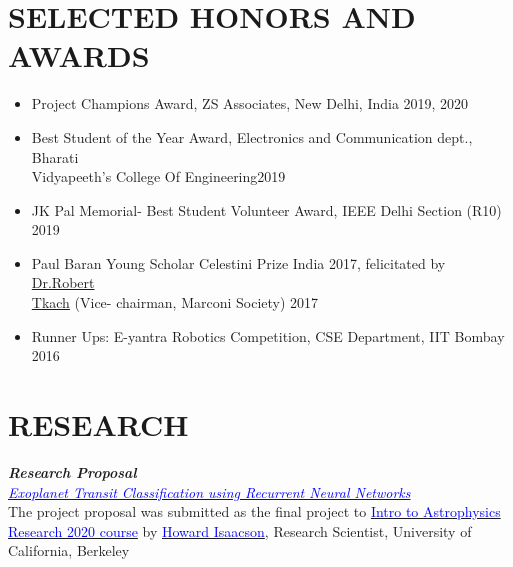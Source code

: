 \documentclass[11pt]{res} %
\newcommand{\titlegap}{5pt} %
\newcommand{\sectgap}{0.05in} %
\begin{document}
\begin{resume}
\vspace{\sectgap}
\hline
\section{SELECTED HONORS AND AWARDS}

\vspace{0.2in} 

\begin{itemize}
    \item Project Champions Award, ZS Associates, New Delhi, India \hfill 2019, 2020
    \item Best Student of the Year Award, Electronics and Communication dept., Bharati \\
    Vidyapeeth's College Of Engineering\hfill 2019
    \item{}JK Pal Memorial- Best Student Volunteer Award, IEEE Delhi Section (R10) \hfill 2019
    \item Paul Baran Young Scholar Celestini Prize India 2017, felicitated by \href{https://marconisociety.org/about/board-of-directors/robert-tkach-2/}{Dr.Robert\\
    Tkach} (Vice-
    chairman, Marconi Society) \hfill 2017
    \item Runner Ups: E-yantra Robotics Competition, CSE Department, IIT Bombay \hfill 2016
\end{itemize}

\vspace{\sectgap} 

\hline



\section{\large RESEARCH}

\vspace{\titlegap}

\textbf{\textit{Research Proposal}}\\
\textit{\href{https://drive.google.com/file/d/1Dy6xjWMH5EVmVreHnUj9QBFsuitt-dDZ/view?usp=sharing}{\textcolor{blue}{Exoplanet Transit Classification using Recurrent Neural Networks}}}\\
The project proposal was submitted as the final project to \href{https://github.com/howardisaacson/Intro-to-Astro-2020}{\textcolor{blue}{Intro to Astrophysics Research 2020 course}} by \href{https://hisaacson2.wixsite.com/website}{\textcolor{blue}{Howard Isaacson}}, Research Scientist, University of California, Berkeley



\end{resume}
\end{document}
